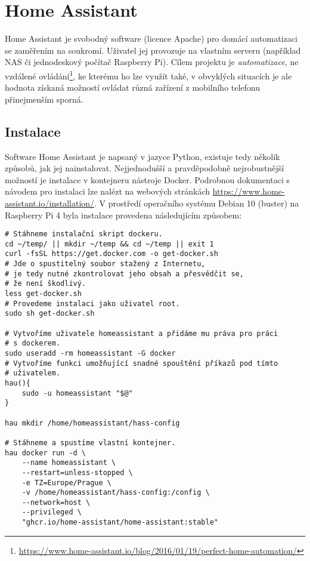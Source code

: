 \section{Home Assistant}
Home Assistant je svobodný software (licence Apache) pro domácí automatizaci se
zaměřením na soukromí. Uživatel jej provozuje na vlastním serveru (například
NAS či jednodeskový počítač Raspberry Pi). Cílem projektu je
\emph{automatizace}, ne vzdálené
ovládání\footnote{\url{https://www.home-assistant.io/blog/2016/01/19/perfect-home-automation/}},
ke kterému ho lze využít také, v obvyklých situacích je ale hodnota získaná
možností ovládat různá zařízení z mobilního telefonu přinejmenším sporná.

\subsection{Instalace}
Software Home Assistant je napsaný v jazyce Python, existuje tedy několik
způsobů, jak jej nainstalovat. Nejjednodušší a pravděpodobně nejrobustnější
možností je instalace v kontejneru nástroje Docker. Podrobnou dokumentaci
s návodem pro instalaci lze nalézt na webových stránkách
\url{https://www.home-assistant.io/installation/}.
V prostředí operačního systému Debian 10 (buster) na Raspberry Pi 4 byla
instalace provedena následujícím způsobem:
\begin{lstlisting}[language=mybash]
# Stáhneme instalační skript dockeru.
cd ~/temp/ || mkdir ~/temp && cd ~/temp || exit 1
curl -fsSL https://get.docker.com -o get-docker.sh
# Jde o spustitelný soubor stažený z Internetu,
# je tedy nutné zkontrolovat jeho obsah a přesvědčit se,
# že není škodlivý.
less get-docker.sh
# Provedeme instalaci jako uživatel root.
sudo sh get-docker.sh

# Vytvoříme uživatele homeassistant a přidáme mu práva pro práci
# s dockerem.
sudo useradd -rm homeassistant -G docker
# Vytvoříme funkci umožňující snadné spouštění příkazů pod tímto
# uživatelem.
hau(){
    sudo -u homeassistant "$@"
}

hau mkdir /home/homeassistant/hass-config

# Stáhneme a spustíme vlastní kontejner.
hau docker run -d \
    --name homeassistant \
    --restart=unless-stopped \
    -e TZ=Europe/Prague \
    -v /home/homeassistant/hass-config:/config \
    --network=host \
    --privileged \
    "ghcr.io/home-assistant/home-assistant:stable"
\end{lstlisting}

